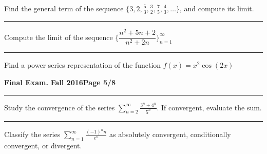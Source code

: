 \documentclass[12pt]{article}
\theoremstyle{definition}
\begin{document}
{{\bigskip
{\problem[10 pts] Find the general term of the sequence $\big\{
  3,2,\frac{5}{3}, \frac{3}{2}, \frac{7}{5}, \frac{4}{3}, \dotsc
  \big\}$, and compute its limit.}
\vspace{3cm}
\begin{flushright}
\end{flushright}
\hrule

{ Compute the limit of the sequence $\bigg\{
\dfrac{n^2+5n+2}{n^2+2n} \bigg\}_{n=1}^\infty$}
\vspace{4cm}
\begin{flushright}
\end{flushright}
\hrule

{\problem[5 pts] Find a power series representation of the function $f(x) = x^2 \cos (2x)$}
\vspace{5cm}
\begin{flushright}
\end{flushright}

\newpage

\hfill{\large\bf Final Exam.}\hfill{\large\bf
  Fall 2016}\hfill{\large\bf Page 5/8}\hrule
  
\bigskip

{\problem[10 pts] Study the convergence of the series
  $\displaystyle{\sum_{n=2}^\infty \frac{3^n+4^n}{5^n}}$.  If
  convergent, evaluate the sum.
\vspace{6.5cm}
\begin{flushright}
\end{flushright}
\hrule
{\problem[10 pts] Classify the series $\displaystyle{\sum_{n=1}^\infty
    \frac{(-1)^n n}{e^n}}$ as absolutely
  convergent, conditionally convergent, or divergent.}
\vspace{6.5cm}
\begin{flushright}
\end{flushright}
\newpage

}}}
\end{document}
